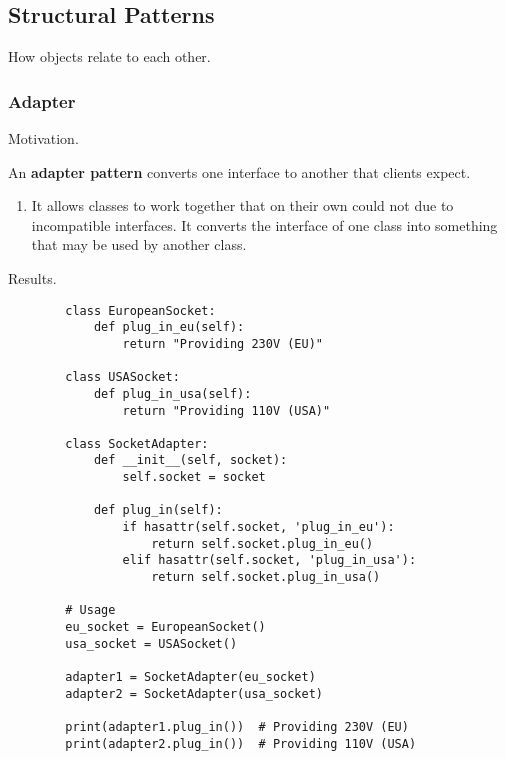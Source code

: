 \subsection{Structural Patterns}

  How objects relate to each other. 

  \subsubsection{Adapter}

    Motivation. 

    \begin{definition}
      An \textbf{adapter pattern} converts one interface to another that clients expect. 
      \begin{enumerate}
        \item It allows classes to work together that on their own could not due to incompatible interfaces. It converts the interface of one class into something that may be used by another class. 
      \end{enumerate}
    \end{definition}

    Results. 

    \begin{example}[Sockets]
      \begin{lstlisting}
        class EuropeanSocket:
            def plug_in_eu(self):
                return "Providing 230V (EU)"

        class USASocket:
            def plug_in_usa(self):
                return "Providing 110V (USA)"

        class SocketAdapter:
            def __init__(self, socket):
                self.socket = socket
            
            def plug_in(self):
                if hasattr(self.socket, 'plug_in_eu'):
                    return self.socket.plug_in_eu()
                elif hasattr(self.socket, 'plug_in_usa'):
                    return self.socket.plug_in_usa()

        # Usage
        eu_socket = EuropeanSocket()
        usa_socket = USASocket()

        adapter1 = SocketAdapter(eu_socket)
        adapter2 = SocketAdapter(usa_socket)

        print(adapter1.plug_in())  # Providing 230V (EU)
        print(adapter2.plug_in())  # Providing 110V (USA) 
      \end{lstlisting}
    \end{example}


